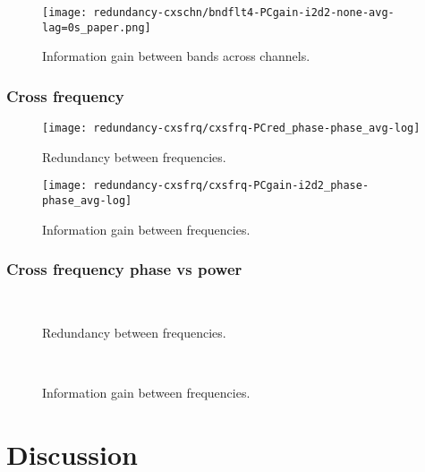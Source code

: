 \begin{figure}[htb]
    \centering
    \texttt{[image: redundancy-cxschn/bndflt4-PCgain-i2d2-none-avg-lag=0s\_paper.png]}
    \caption{Information gain between bands across channels.
}
\label{fig:lam_phase_cxchn_info_gain}
\end{figure}

\subsubsection{Cross frequency}

\begin{figure}[htb]
    \centering
    \texttt{[image: redundancy-cxsfrq/cxsfrq-PCred\_phase-phase\_avg-log]}
    \caption{
Redundancy between frequencies.
}
\label{fig:lam_phase_cxfrq_info_red}
\end{figure}

\begin{figure}[htb]
    \centering
    \texttt{[image: redundancy-cxsfrq/cxsfrq-PCgain-i2d2\_phase-phase\_avg-log]}
    \caption{
Information gain between frequencies.
}
\label{fig:lam_phase_cxfrq_info_gain}
\end{figure}

\subsubsection{Cross frequency phase vs power}

\begin{figure}[htb]
    \centering
    \\
    \caption{
Redundancy between frequencies.
}
\label{fig:lam_cxfrq_powerphase_info_red}
\end{figure}



\begin{figure}[htb]
    \centering
    \\
    \caption{
Information gain between frequencies.
}
\label{fig:lam_cxfrq_powerphase_info_gain}
\end{figure}

\section{Discussion}
